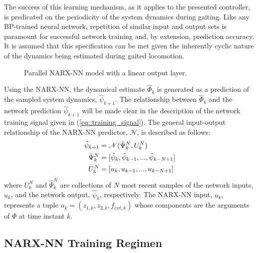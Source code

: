The success of this learning mechanism, as it applies to the presented controller, is predicated on the periodicity of the 
system dynamics during gaiting. Like any BP-trained neural network, repetition of similar input and output sets is paramount for successful network training and, by extension, prediction accuracy. It is assumed that this specification can be met given the 
inherently cyclic nature of the dynamics being estimated during gaited locomotion. 
	\begin{figure}[t!]
		\centering
		\caption{Parallel NARX-NN model with a linear output layer.}
		\label{fig::narx_net}
		\vspace{-7mm}
	\end{figure}
Using the NARX-NN, the dynamical estimate $\hat{\Phi}_{k}$ is generated as a prediction of the sampled system dynamics, $\hat{\psi}_{k+1}$. The relationship between $\hat{\Phi}_{k}$ and the network prediction $\hat{\psi}_{k+1}$ will be made clear in the description of the network training signal given in (\ref{eq::training_signal}). The general input-output relationship of the NARX-NN predictor, $\mathscr{N}$, is described as follows:
	\begin{equation}
		\vspace{-1.5mm}
		\begin{split}
		\hat{\psi}_{k+1}	&= \mathscr{N}(\hat{\Psi}_{k}^{N},{U}_{k}^{N}) \\
		\hat{\Psi}_{k}^{N}	&= [\hat{\psi}_{k},\hat{\psi}_{k-1},...,\hat{\psi}_{k-N+1}]  \\
		{U}_{k}^{N}			&= [u_{k}   ,u_{k-1}   ,...,u_{k-N+1}   ]
		\end{split}
		\label{eq::narx_model}
	\end{equation}
where ${U}_{k}^{N}$  and $\hat{\Psi}_{k}^{N}$ are collections of $N$ most recent samples of the network inputs, $u_{k}$, and the network output, $\hat{\psi}_{k}$, respectively. The NARX-NN input, $u_{k}$, represents a tuple $u_{k} = (z_{1,k}, z_{2,k}, f_{ext,k})$ whose components are the arguments of $\Phi$ at time instant $k$. 



\subsection{NARX-NN Training Regimen}
	

